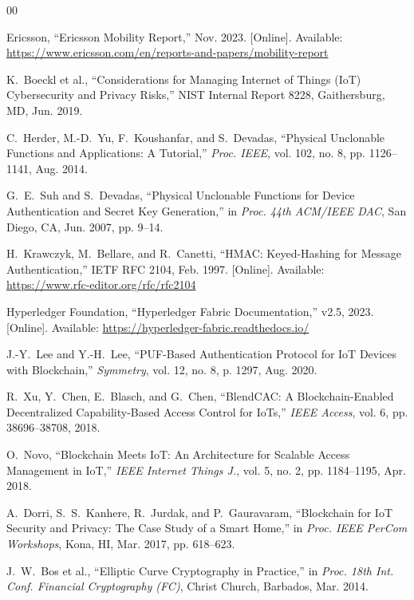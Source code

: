 \documentclass[conference]{IEEEtran}
\begin{document}
\balance
\begin{thebibliography}{00}

Ericsson, ``Ericsson Mobility Report,'' Nov. 2023. [Online]. Available:
\url{https://www.ericsson.com/en/reports-and-papers/mobility-report}

K.\ Boeckl et al., ``Considerations for Managing Internet of Things (IoT)
Cybersecurity and Privacy Risks,'' NIST Internal Report 8228,
Gaithersburg, MD, Jun. 2019.

C.\ Herder, M.-D.\ Yu, F.\ Koushanfar, and S.\ Devadas,
``Physical Unclonable Functions and Applications: A Tutorial,''
\textit{Proc. IEEE}, vol. 102, no. 8, pp. 1126--1141, Aug. 2014.

G.\ E.\ Suh and S.\ Devadas,
``Physical Unclonable Functions for Device Authentication and Secret Key
Generation,'' in \textit{Proc. 44th ACM/IEEE DAC},
San Diego, CA, Jun. 2007, pp. 9--14.

H.\ Krawczyk, M.\ Bellare, and R.\ Canetti,
``HMAC: Keyed-Hashing for Message Authentication,''
IETF RFC 2104, Feb. 1997. [Online]. Available:
\url{https://www.rfc-editor.org/rfc/rfc2104}

Hyperledger Foundation, ``Hyperledger Fabric Documentation,'' v2.5, 2023.
[Online]. Available: \url{https://hyperledger-fabric.readthedocs.io/}

J.-Y.\ Lee and Y.-H.\ Lee,
``PUF-Based Authentication Protocol for IoT Devices with Blockchain,''
\textit{Symmetry}, vol. 12, no. 8, p. 1297, Aug. 2020.

R.\ Xu, Y.\ Chen, E.\ Blasch, and G.\ Chen,
``BlendCAC: A Blockchain-Enabled Decentralized Capability-Based Access Control
for IoTs,'' \textit{IEEE Access}, vol. 6, pp. 38696--38708, 2018.

O.\ Novo,
``Blockchain Meets IoT: An Architecture for Scalable Access Management in IoT,''
\textit{IEEE Internet Things J.}, vol. 5, no. 2, pp. 1184--1195, Apr. 2018.

A.\ Dorri, S.\ S.\ Kanhere, R.\ Jurdak, and P.\ Gauravaram,
``Blockchain for IoT Security and Privacy: The Case Study of a Smart Home,''
in \textit{Proc. IEEE PerCom Workshops}, Kona, HI, Mar. 2017,
pp. 618--623.

J.\ W.\ Bos et al., ``Elliptic Curve Cryptography in Practice,''
in \textit{Proc. 18th Int. Conf. Financial Cryptography (FC)},
Christ Church, Barbados, Mar. 2014.


\end{thebibliography}
\end{document}
